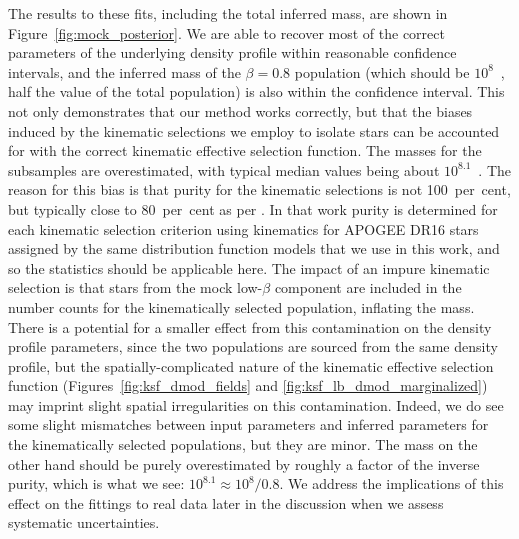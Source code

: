 The results to these fits, including the total inferred mass, are shown in Figure~\ref{fig:mock_posterior}. We are able to recover most of the correct parameters of the underlying density profile within reasonable confidence intervals, and the inferred mass of the $\beta=0.8$ population (which should be $10^{8}$~\Msun, half the value of the total population) is also within the confidence interval. This not only demonstrates that our method works correctly, but that the biases induced by the kinematic selections we employ to isolate \gse stars can be accounted for with the correct kinematic effective selection function. The masses for the \gse subsamples are overestimated, with typical median values being about $10^{8.1}$~\Msun. The reason for this bias is that purity for the kinematic selections is not 100~per~cent, but typically close to 80~per~cent as per \cite{lane22} \parencite[also see e.g.][]{limberg22}. In that work purity is determined for each kinematic selection criterion using kinematics for APOGEE DR16 stars assigned by the same distribution function models that we use in this work, and so the statistics should be applicable here. The impact of an impure kinematic selection is that stars from the mock low-$\beta$ component are included in the number counts for the kinematically selected population, inflating the mass. There is a potential for a smaller effect from this contamination on the density profile parameters, since the two populations are sourced from the same density profile, but the spatially-complicated nature of the kinematic effective selection function (Figures~\ref{fig:ksf_dmod_fields} and \ref{fig:ksf_lb_dmod_marginalized}) may imprint slight spatial irregularities on this contamination. Indeed, we do see some slight mismatches between input parameters and inferred parameters for the kinematically selected populations, but they are minor. The mass on the other hand should be purely overestimated by roughly a factor of the inverse purity, which is what we see: $10^{8.1} \approx 10^{8}/0.8$. We address the implications of this effect on the fittings to real data later in the discussion when we assess systematic uncertainties.

